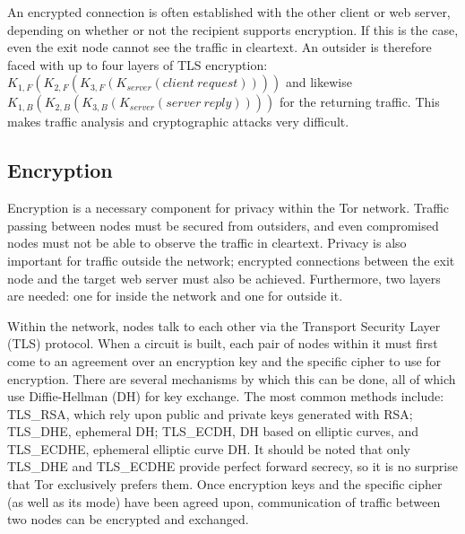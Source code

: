 \documentclass[journal]{IEEEtran}
\begin{document}
An encrypted connection is often established with the other client or web server, depending on whether or not the recipient supports encryption. If this is the case, even the exit node cannot see the traffic in cleartext. An outsider is therefore faced with up to four layers of TLS encryption: $K_{1,F}(K_{2,F}(K_{3,F}(K_{server}(client\ request))))$ and likewise $K_{1,B}(K_{2,B}(K_{3,B}(K_{server}(server\ reply))))$ for the returning traffic. This makes traffic analysis and cryptographic attacks very difficult.

\subsection{Encryption}

Encryption is a necessary component for privacy within the Tor network. Traffic passing between nodes must be secured from outsiders, and even compromised nodes must not be able to observe the traffic in cleartext. Privacy is also important for traffic outside the network; encrypted connections between the exit node and the target web server must also be achieved. Furthermore, two layers are needed: one for inside the network and one for outside it.

Within the network, nodes talk to each other via the Transport Security Layer (TLS) protocol. When a circuit is built, each pair of nodes within it must first come to an agreement over an encryption key and the specific cipher to use for encryption. There are several mechanisms by which this can be done, all of which use Diffie-Hellman (DH) for key exchange. The most common methods include: TLS\_RSA, which rely upon public and private keys generated with RSA; TLS\_DHE, ephemeral DH; TLS\_ECDH, DH based on elliptic curves, and TLS\_ECDHE, ephemeral elliptic curve DH. It should be noted that only TLS\_DHE and TLS\_ECDHE provide perfect forward secrecy, so it is no surprise that Tor exclusively prefers them. Once encryption keys and the specific cipher (as well as its mode) have been agreed upon, communication of traffic between two nodes can be encrypted and exchanged.

\end{document}

